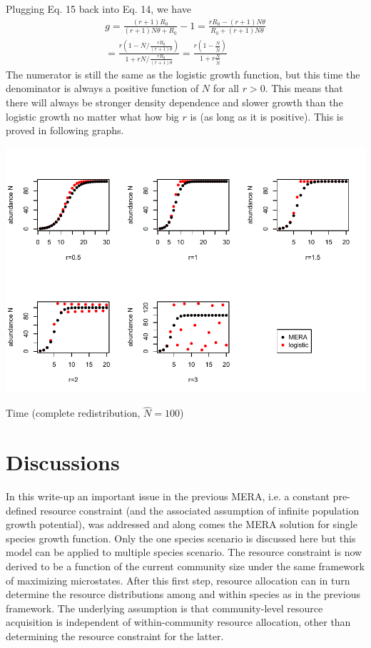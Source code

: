 \documentclass[12pt]{article}
\begin{document}
Plugging Eq. 15 back into Eq. 14, we have
 \begin{equation}
 \begin{split}
g = \frac{(r+1) R_0}{(r+1) N \theta +R_0} -1 = \frac{rR_0  - (r+1) N \theta }{R_0 + (r+1) N \theta} \\
= \frac{ r(1- N/\frac{r R_0}{(r+1) \theta})} {1+ r N/\frac{r R_0}{(r+1) \theta}} = \frac{ r(1- \frac{N }{\hat{N}})} {1+ r \frac{N }{\hat{N}}}
\end{split}
\end{equation}
The numerator is still the same as the logistic growth function, but this time the denominator is always a positive function of $N$ for all $r>0$. This means that there will always be stronger density dependence and slower growth than the logistic growth no matter what how big $r$ is (as long as it is positive). This is proved in following graphs.

\includegraphics[width=\textwidth]{complete_result.pdf}

\begin{center}
Time (complete redistribution, $\hat {N} =100$)
\end{center}

\section{Discussions}
In this write-up an important issue in the previous MERA, i.e. a constant pre-defined resource constraint (and the associated assumption of infinite population growth potential), was addressed and along comes the MERA solution for single species growth function. Only the one species scenario is discussed here but this model can be applied to multiple species scenario. The resource constraint is now derived to be a function of the current community size under the same framework of maximizing microstates. After this first step, resource allocation can in turn determine the resource distributions among and within species as in the previous framework. The underlying assumption is that community-level resource acquisition is independent of within-community resource allocation, other than determining the resource constraint for the latter. 
\end{document}

